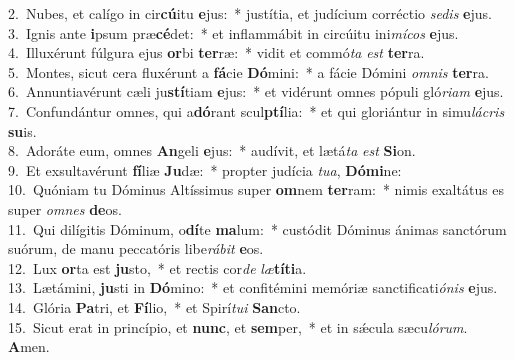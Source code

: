 {2.~}Nubes, et calígo in cir\textbf{cú}itu \textbf{e}jus:~* justítia, et judícium corréctio \textit{se}\textit{dis} \textbf{e}jus.\\
{3.~}Ignis ante \textbf{i}psum præ\textbf{cé}det:~* et inflammábit in circúitu ini\textit{mí}\textit{cos} \textbf{e}jus.\\
{4.~}Illuxérunt fúlgura ejus \textbf{or}bi \textbf{ter}ræ:~* vidit et commó\textit{ta} \textit{est} \textbf{ter}ra.\\
{5.~}Montes, sicut cera fluxérunt a \textbf{fá}cie \textbf{Dó}mini:~* a fácie Dómini \textit{om}\textit{nis} \textbf{ter}ra.\\
{6.~}Annuntiavérunt cæli ju\textbf{stí}tiam \textbf{e}jus:~* et vidérunt omnes pópuli gló\textit{ri}\textit{am} \textbf{e}jus.\\
{7.~}Confundántur omnes, qui a\textbf{dó}rant scul\textbf{ptí}lia:~* et qui gloriántur in simu\textit{lá}\textit{cris} \textbf{su}is.\\
{8.~}Adoráte eum, omnes \textbf{An}geli \textbf{e}jus:~* audívit, et lætá\textit{ta} \textit{est} \textbf{Si}on.\\
{9.~}Et exsultavérunt \textbf{fí}liæ \textbf{Ju}dæ:~* propter judícia \textit{tu}\textit{a}, \textbf{Dó}\textbf{mi}ne:\\
{10.~}Quóniam tu Dóminus Altíssimus super \textbf{om}nem \textbf{ter}ram:~* nimis exaltátus es super \textit{om}\textit{nes} \textbf{de}os.\\
{11.~}Qui dilígitis Dóminum, o\textbf{dí}te \textbf{ma}lum:~* custódit Dóminus ánimas sanctórum suórum, de manu peccatóris libe\textit{rá}\textit{bit} \textbf{e}os.\\
{12.~}Lux \textbf{or}ta est \textbf{ju}sto,~* et rectis cor\textit{de} \textit{læ}\textbf{tí}\textbf{ti}a.\\
{13.~}Lætámini, \textbf{ju}sti in \textbf{Dó}mino:~* et confitémini memóriæ sanctificati\textit{ó}\textit{nis} \textbf{e}jus.\\
{14.~}Glória \textbf{Pa}tri, et \textbf{Fí}lio,~* et Spirí\textit{tu}\textit{i} \textbf{San}cto.\\
{15.~}Sicut erat in princípio, et \textbf{nunc}, et \textbf{sem}per,~* et in sǽcula sæcu\textit{ló}\textit{rum}. \textbf{A}men.\\
